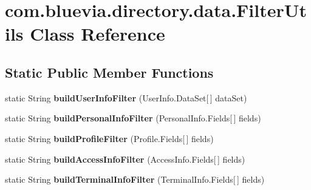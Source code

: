 \hypertarget{classcom_1_1bluevia_1_1directory_1_1data_1_1FilterUtils}{
\section{com.bluevia.directory.data.FilterUtils Class Reference}
\label{classcom_1_1bluevia_1_1directory_1_1data_1_1FilterUtils}
}
\subsection*{Static Public Member Functions}
\begin{DoxyCompactItemize}
\item 
\hypertarget{classcom_1_1bluevia_1_1directory_1_1data_1_1FilterUtils_a09fa393ef879a777156a48030ade9a20}{
static String {\bfseries buildUserInfoFilter} (UserInfo.DataSet\mbox{[}$\,$\mbox{]} dataSet)}
\label{classcom_1_1bluevia_1_1directory_1_1data_1_1FilterUtils_a09fa393ef879a777156a48030ade9a20}

\item 
\hypertarget{classcom_1_1bluevia_1_1directory_1_1data_1_1FilterUtils_a101a4ae788579367ebc813ed828bca9e}{
static String {\bfseries buildPersonalInfoFilter} (PersonalInfo.Fields\mbox{[}$\,$\mbox{]} fields)}
\label{classcom_1_1bluevia_1_1directory_1_1data_1_1FilterUtils_a101a4ae788579367ebc813ed828bca9e}

\item 
\hypertarget{classcom_1_1bluevia_1_1directory_1_1data_1_1FilterUtils_aa611e4464bc105ab2cf723881cedbc3f}{
static String {\bfseries buildProfileFilter} (Profile.Fields\mbox{[}$\,$\mbox{]} fields)}
\label{classcom_1_1bluevia_1_1directory_1_1data_1_1FilterUtils_aa611e4464bc105ab2cf723881cedbc3f}

\item 
\hypertarget{classcom_1_1bluevia_1_1directory_1_1data_1_1FilterUtils_a863b6ae32460453bb3a2f02ea561c429}{
static String {\bfseries buildAccessInfoFilter} (AccessInfo.Fields\mbox{[}$\,$\mbox{]} fields)}
\label{classcom_1_1bluevia_1_1directory_1_1data_1_1FilterUtils_a863b6ae32460453bb3a2f02ea561c429}

\item 
\hypertarget{classcom_1_1bluevia_1_1directory_1_1data_1_1FilterUtils_adbfe5281a1881255b508758b57d3ed60}{
static String {\bfseries buildTerminalInfoFilter} (TerminalInfo.Fields\mbox{[}$\,$\mbox{]} fields)}
\label{classcom_1_1bluevia_1_1directory_1_1data_1_1FilterUtils_adbfe5281a1881255b508758b57d3ed60}

\end{DoxyCompactItemize}

